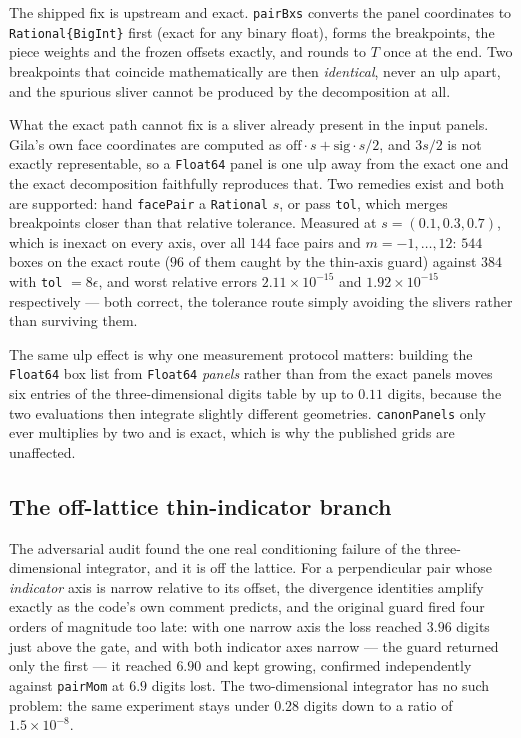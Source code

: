 \documentclass[11pt]{article}
\theoremstyle{remark}
\newcommand{\code}[1]{\texttt{#1}}
\begin{document}
The shipped fix is upstream and exact. \code{pairBxs} converts the panel coordinates to
\code{Rational\{BigInt\}} first (exact for any binary float), forms the breakpoints, the
piece weights and the frozen offsets exactly, and rounds to $T$ once at the end. Two
breakpoints that coincide mathematically are then \emph{identical}, never an ulp apart, and
the spurious sliver cannot be produced by the decomposition at all.

What the exact path cannot fix is a sliver already present in the input panels. Gila's own
face coordinates are computed as $\mathrm{off}\cdot s + \mathrm{sig}\cdot s/2$, and $3s/2$
is not exactly representable, so a \code{Float64} panel is one ulp away from the exact one
and the exact decomposition faithfully reproduces that. Two remedies exist and both are
supported: hand \code{facePair} a \code{Rational} $s$, or pass \code{tol}, which merges
breakpoints closer than that relative tolerance. Measured at $s = (0.1, 0.3, 0.7)$, which
is inexact on every axis, over all $144$ face pairs and $m = -1,\ldots,12$: $544$ boxes on
the exact route ($96$ of them caught by the thin-axis guard) against $384$ with
\code{tol} $ = 8\epsilon$, and worst relative errors $2.11\times10^{-15}$ and
$1.92\times10^{-15}$ respectively --- both correct, the tolerance route simply avoiding the
slivers rather than surviving them.

The same ulp effect is why one measurement protocol matters: building the \code{Float64}
box list from \code{Float64} \emph{panels} rather than from the exact panels moves six
entries of the three-dimensional digits table by up to $0.11$ digits, because the two
evaluations then integrate slightly different geometries. \code{canonPanels} only ever
multiplies by two and is exact, which is why the published grids are unaffected.

\subsection{The off-lattice thin-indicator branch}
\label{sec:thin}

The adversarial audit found the one real conditioning failure of the three-dimensional
integrator, and it is off the lattice. For a perpendicular pair whose \emph{indicator} axis
is narrow relative to its offset, the divergence identities amplify exactly as the code's
own comment predicts, and the original guard fired four orders of magnitude too late: with
one narrow axis the loss reached $3.96$ digits just above the gate, and with both indicator
axes narrow --- the guard returned only the first --- it reached $6.90$ and kept growing,
confirmed independently against \code{pairMom} at $6.9$ digits lost. The two-dimensional
integrator has no such problem: the same experiment stays under $0.28$ digits down to a
ratio of $1.5\times10^{-8}$.
\end{document}
